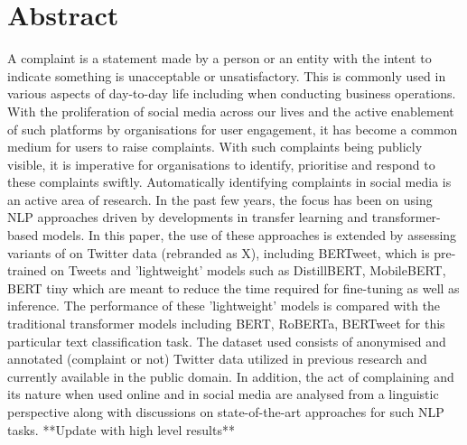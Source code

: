 \chapter*{\Large \center Abstract}

A complaint is a statement made by a person or an entity with the intent to indicate something is unacceptable or unsatisfactory. This is commonly used in various aspects of day-to-day life including when conducting business operations. With the proliferation of social media across our lives and the active enablement of such platforms by organisations for user engagement, it has become a common medium for users to raise complaints. With such complaints being publicly visible, it is imperative for organisations to identify, prioritise and respond to these complaints swiftly. Automatically identifying complaints in social media is an active area of research. In the past few years, the focus has been on using NLP approaches driven by developments in transfer learning and transformer-based models.
\newline \newline
In this paper, the use of these approaches is extended by assessing variants of  on Twitter data (rebranded as X), including BERTweet, which is pre-trained on Tweets and 'lightweight' models such as DistillBERT, MobileBERT, BERT tiny which are meant to reduce the time required for fine-tuning as well as inference. The performance of these 'lightweight' models is compared with the traditional transformer models including BERT, RoBERTa, BERTweet for this particular text classification task. The dataset used consists of anonymised and annotated (complaint or not) Twitter data utilized in previous research and currently available in the public domain. In addition, the act of complaining and its nature when used online and in social media are analysed from a linguistic perspective along with discussions on state-of-the-art approaches for such NLP tasks.
\newline \newline
**Update with high level results**